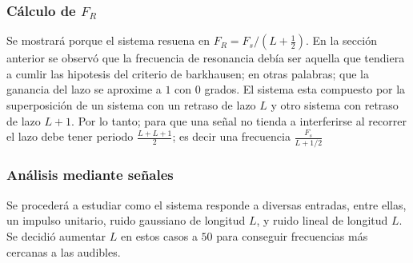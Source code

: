 \documentclass[assd_tp2_main.tex]{subfiles}
\begin{document}
\subsubsection{Cálculo de $F_R$}
Se mostrará porque el sistema resuena en $F_R=F_s/(L+\frac{1}{2})$. En la sección anterior se observó que la frecuencia de resonancia debía ser aquella que tendiera a cumlir las hipotesis del criterio de barkhausen; en otras palabras; que la ganancia del lazo se aproxime a $1$ con $0$ grados. 
El sistema esta compuesto por la superposición de un sistema con un retraso de lazo $L$ y otro sistema con retraso de lazo $L+1$. Por lo tanto; para que una señal no tienda a interferirse al recorrer el lazo debe tener periodo $\frac{L+L+1}{2}$; es decir una frecuencia $\frac{F_s}{L+1/2}$

\subsubsection{Análisis mediante señales}
 
Se procederá a estudiar como el sistema responde a diversas entradas, entre ellas, un impulso unitario, ruido gaussiano de longitud $L$, y ruido lineal de longitud $L$. Se decidió aumentar $L$ en estos casos a $50$ para conseguir frecuencias más cercanas a las audibles.
 
\end{document}

